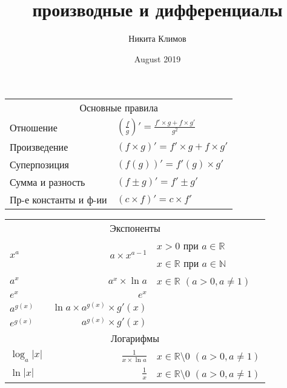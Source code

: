 \documentclass{article}
\title{производные и дифференциалы}
\author{Никита Климов}
\date{August 2019}
\begin{document}
    \begin{multicols}{3}

        \begin{wraptable}{i}{0.7\linewidth}
            \begin{tabular}{ll}
            	\multicolumn{2}{c}{Основные правила} \\
                Отношение & 
                \begin{math}
                    \displaystyle \left ( \frac{f}{g} \right )'= \frac{f' \times{g} + f \times{g'}}{g^2}
                \end{math} \\[0.5mm]
                Произведение &
                \begin{math}
                    \left ( f \times{g} \right )' = f' \times{g} + f \times{g'}
                \end{math} \\
                Суперпозиция &
                \begin{math}
                    \left (f \left (g \right ) \right )' = f'\left (g \right ) \times{g'}
                \end{math} \\
                Сумма и разность &
                \begin{math}
                    \left (f \pm g \right )' = f' \pm g'
                \end{math} \\
                Пр-е константы и ф-ии &$\left(c\times{f}\right)' = c \times f'$\\
            \end{tabular}
        	\begin{tabular}{l|r|l}
	        	\multicolumn{3}{c}{Экспоненты} \\
	        	\multirow{2}{*}{$x^a$} & \multirow{2}{*}{$a\times{x^{a-1}}$}& $x > 0$ при $a \in \mathbb{R}$ \\
	        	&&$x \in \mathbb{R}$ при $a \in \mathbb{N}$ \\\hline
	        	$a^x$ & $a^x \times{\ln{a}}$ & $x \in \mathbb{R}$ $(a > 0, a \ne 1) $ \\\hline
	        	$e^x$ & $e^x$ &\\\hline
	        	$a^{g\left(x\right)}$&$\ln{a}\times{a^{g\left(x\right)}}\times{g'\left(x\right)}$&\\\hline
	        	$e^{g\left(x\right)}$&$a^{g\left(x\right)}\times{g'\left(x\right)}$&\\
	        	\multicolumn{3}{c}{Логарифмы} \\
	        	$\log_a{|x|}$&$\displaystyle \frac{1}{x\times{\ln{a}}}$&$x \in \mathbb{R} \setminus 0$ $(a > 0, a \ne 1)$\\[2mm]\hline
	        	$\ln{|x|}$&$\displaystyle \frac{1}{x}$&$x \in \mathbb{R} \setminus 0$ $(a > 0, a \ne 1)$\\
        	\end{tabular}
        \end{wraptable}


\end{multicols}
\end{document}
